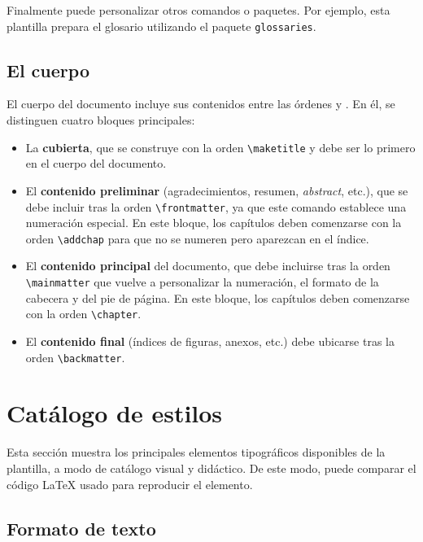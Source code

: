 Finalmente puede personalizar otros comandos o paquetes. Por ejemplo, esta plantilla prepara el glosario utilizando el paquete \lstinline|glossaries|.

\subsection{El cuerpo}

El cuerpo del documento incluye sus contenidos entre las órdenes \lstinline|| y \lstinline||. En él, se distinguen cuatro bloques principales: 
\begin{itemize}\itemsep 0em
    \item La \textbf{cubierta}, que se construye con la orden \lstinline{\maketitle} y debe ser lo primero en el cuerpo del documento.
    \item El \textbf{contenido preliminar} (agradecimientos, resumen, \textit{abstract}, etc.), que se debe incluir tras la orden \lstinline{\frontmatter}, ya que este comando establece una numeración especial. En este bloque, los capítulos deben comenzarse con la orden \lstinline{\addchap} para que no se numeren pero aparezcan en el índice.
    \item El \textbf{contenido principal} del documento, que debe incluirse tras la orden \lstinline{\mainmatter} que vuelve a personalizar la numeración, el formato de la cabecera y del pie de página. En este bloque, los capítulos deben comenzarse con la orden \lstinline{\chapter}.
    \item El \textbf{contenido final} (índices de figuras, anexos, etc.) debe ubicarse tras la orden \lstinline{\backmatter}.
\end{itemize}

\section{Catálogo de estilos}

Esta sección muestra los principales elementos tipográficos disponibles de la plantilla, a modo de catálogo visual y didáctico. De este modo, puede comparar el código \LaTeX{} usado para reproducir el elemento. 

\subsection{Formato de texto}

